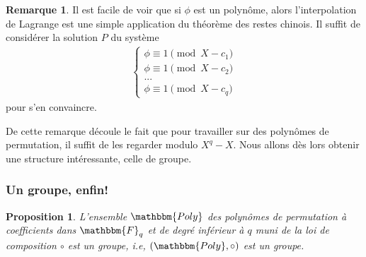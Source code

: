\documentclass[12pt]{article}
\newcommand{\Fq}{\mathbbm{F}_q}
\newtheorem{prop}{Proposition}
\theoremstyle{definition}
\newtheorem{rem}{Remarque}
\begin{document}
\begin{rem}
Il est facile de voir que si $\phi $ est un polynôme, alors l'interpolation de Lagrange est une simple application du théorème des restes chinois. \newline
Il suffit de considérer la solution $P$ du système
	\begin{align*}
		\begin{cases}
			\phi \equiv 1 \pmod{X - c_1} \\
			\phi \equiv 1 \pmod{X - c_2} \\
			... \\
			\phi \equiv 1 \pmod{X - c_q}
  		\end{cases}
	\end{align*}
pour s'en convaincre.
\end{rem}

De cette remarque découle le fait que pour travailler sur des polynômes de permutation, il suffit de les regarder modulo $X^q - X$. Nous allons dès lors obtenir une structure intéressante, celle de groupe.

\subsubsection{Un groupe, enfin!} 

\begin{prop}
L'ensemble $\mathbbm{Poly}$ des polynômes de permutation  à coefficients dans $\Fq$ et de degré inférieur à $q$ muni de la loi de composition $\circ$ est un groupe, i.e, $(\mathbbm{Poly}, \circ)$ est un groupe.
\end{prop}
\end{document}
